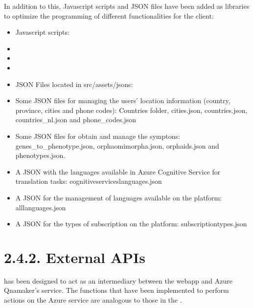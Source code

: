 \documentclass[letterpaper,10pt,english]{sphinxmanual}
\begin{document}
In addition to this, Javascript scripts and JSON files have been added as libraries to optimize the programming of different functionalities for the client:
\begin{itemize}
\item {} 
Javascript scripts:

\end{itemize}
\begin{itemize}
\item {} 

\item {} 

\item {} 

\end{itemize}
\begin{itemize}
\item {} 
JSON Files located in src/assets/jsons:

\end{itemize}
\begin{itemize}
\item {} 
Some JSON files for managing the users’ location information (country, province, cities and phone codes): Countries folder, cities.json, countries.json, countries\_nl.json and phone\_codes.json

\item {} 
Some JSON files for obtain and manage the symptons: genes\_to\_phenotype.json, orpha\sphinxhyphen{}omim\sphinxhyphen{}orpha.json, orphaids.json and phenotypes.json.

\item {} 
A JSON with the languages available in Azure Cognitive Service for translation tasks: cognitive\sphinxhyphen{}services\sphinxhyphen{}languages.json

\item {} 
A JSON for the management of languages available on the platform: all\sphinxhyphen{}languages.json

\item {} 
A JSON for the types of subscription on the platform: subscription\sphinxhyphen{}types.json

\end{itemize}


\section{2.4.2. External APIs}
\label{\detokenize{pages/SW/Code:external-apis}}
 has been designed to act as an intermediary between the webapp and Azure Qnamaker’s service.
The functions that have been implemented to perform actions on the Azure service are analogous to those in the .
\end{document}
